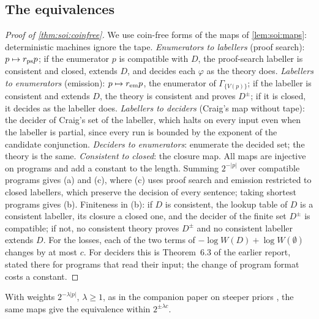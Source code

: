 \subsection{The equivalences}\label{sec:app:soi:equiv}

\begin{proof}[Proof of \cref{thm:soi:coinfree}]
We use coin-free forms of the maps of \cref{lem:soi:maps}: deterministic machines ignore the tape.
\emph{Enumerators to labellers} (proof search): $p\mapsto r_{\rm ps}p$; if the enumerator $p$ is compatible with $D$, the proof-search labeller is consistent and closed, extends $D$, and decides each $\varphi$ as the theory does.
\emph{Labellers to enumerators} (emission): $p\mapsto r_{\rm em}p$, the enumerator of $\Gamma_{\{V(p)\}}$; if the labeller is consistent and extends $D$, the theory is consistent and proves $D^\pm$; if it is closed, it decides as the labeller does.
\emph{Labellers to deciders} (Craig's map without tape): the decider of Craig's set of the labeller, which halts on every input even when the labeller is partial, since every run is bounded by the exponent of the candidate conjunction.
\emph{Deciders to enumerators}: enumerate the decided set; the theory is the same.
\emph{Consistent to closed}: the closure map.
All maps are injective on programs and add a constant to the length. Summing $2^{-\lvert p\rvert}$ over compatible programs gives (a) and (c), where (c) uses proof search and emission restricted to closed labellers, which preserve the decision of every sentence; taking shortest programs gives (b). Finiteness in (b): if $D$ is consistent, the lookup table of $D$ is a consistent labeller, its closure a closed one, and the decider of the finite set $D^\pm$ is compatible; if not, no consistent theory proves $D^\pm$ and no consistent labeller extends $D$. For the losses, each of the two terms of $-\log W(D)+\log W(\emptyset)$ changes by at most $c$. For deciders this is Theorem~6.3 of the earlier report, stated there for programs that read their input; the change of program format costs a constant.
\end{proof}

With weights $2^{-\lambda\lvert p\rvert}$, $\lambda\ge1$, as in the companion paper on steeper priors \citep{claudeSFI2026steeper}, the same maps give the equivalence within $2^{\pm\lambda c}$.

